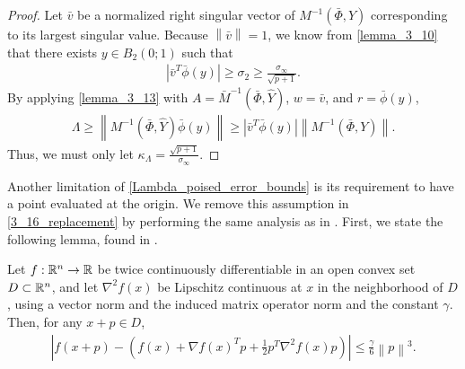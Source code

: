 \begin{proof}
Let $\bar v$ be a normalized right singular vector of $M^{-1}\left(\bar \Phi, Y\right)$ corresponding to its largest singular value.
Because $\left\|\bar v\right\| = 1$, we know from \cref{lemma_3_10} that there exists $y \in B_2\left(0; 1\right)$ such that
\begin{align*}
\left| {\bar v}^T \bar {\phi}(y) \right| \ge \sigma_2 \ge \frac {\sigma_{\infty}}{\sqrt{p+1}}.
\end{align*}
By applying \cref{lemma_3_13} with $A={\bar M}^{-1}\left(\bar \Phi, \hat Y\right)$, $w = \bar v$, and $r = \bar \phi(y)$,
\begin{align*}
\Lambda \ge \left\|M^{-1}\left(\bar \Phi, \hat Y\right) \bar{\phi}(y)\right\| \ge |\bar v^T \bar \phi(y)| \left\|M^{-1}\left(\bar \Phi, Y\right)\right\|.
\end{align*}
Thus, we must only let $\kappa_{\Lambda} = \frac {\sqrt{p+1}}{\sigma_{\infty}}$.

\end{proof}


Another limitation of \cref{Lambda_poised_error_bounds} is its requirement to have a point evaluated at the origin.
We remove this assumption in \cref{3_16_replacement} by performing the same analysis as in \cite[Theorem 3.16]{introduction_book}.
First, we state the following lemma, found in \cite[Lemma 4.1.14]{dennisschnabel1983}.

\begin{theorem}
\label{4_1_14}
Let $f : \mathbb R^n \to \mathbb R$ be twice continuously differentiable in an open convex set $D \subset \mathbb R^n$,
and let $\nabla^2 f(x)$ be Lipschitz continuous at $x$ in the neighborhood of $D$, 
using a vector norm and the induced matrix operator norm and the constant $\gamma$.
Then, for any $x + p\in D$,
\begin{align*}
\left|f(x + p) - \left(f(x) + \nabla f(x)^T p + \frac 1 2 p^T \nabla^2 f(x)p\right) \right|
\le \frac {\gamma} 6 \left\|p\right\|^3.
\end{align*}
\end{theorem}

